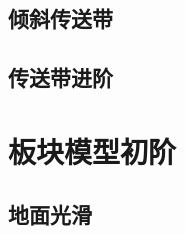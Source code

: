 \documentclass[cn,blue,11pt,normal]{elegantnote}
\begin{document}
\subsection{倾斜传送带}
\begin{proset}
	
\end{proset}
\begin{proset}
	
\end{proset}
\begin{proset}
	
\end{proset}
\begin{proset}
	
\end{proset}
\begin{proset}
	
\end{proset}
\begin{proset}
	
\end{proset}
\begin{proset}
	
\end{proset}
\begin{proset}
	
\end{proset}

\subsection{传送带进阶}
\begin{proset}
	
\end{proset}
\begin{proset}
	
\end{proset}


\section{板块模型初阶}
\subsection{地面光滑}
\end{document}
